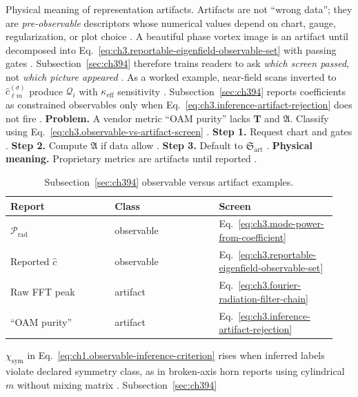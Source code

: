 Physical meaning of representation artifacts. Artifacts are not ``wrong data''; they are \emph{pre-observable} descriptors whose numerical values depend on chart, gauge, regularization, or
plot choice \cite{hansen1988}. A beautiful phase vortex image is an artifact until decomposed into
Eq.~\eqref{eq:ch3.reportable-eigenfield-observable-set} with passing gates \cite{belinfante1940}. Subsection~\ref{sec:ch394}
therefore trains readers to ask \emph{which screen passed}, not \emph{which picture appeared} \cite{harrington2001}.
As a worked example, near-field scans inverted to \(\widehat{c}_{\ell m}^{(\sigma)}\) produce \(\mathcal{Q}_i\) with \(\kappa_{\mathrm{eff}}\) sensitivity
\cite{devaney2004}. Subsection~\ref{sec:ch394} reports coefficients as constrained observables only when
Eq.~\eqref{eq:ch3.inference-artifact-rejection} does not fire \cite{harrington2001}.
\textbf{Problem.} A vendor metric ``OAM purity'' lacks \(\mathbf{T}\) and \(\mathfrak{A}\). Classify using
Eq.~\eqref{eq:ch3.observable-vs-artifact-screen} \cite{harrington2001}.
\textbf{Step 1.} Request chart and gates \cite{hansen1988}.
\textbf{Step 2.} Compute \(\mathfrak{A}\) if data allow \cite{harrington2001}.
\textbf{Step 3.} Default to \(\mathfrak{S}_{\mathrm{art}}\) \cite{belinfante1940}.
\textbf{Physical meaning.} Proprietary metrics are artifacts until reported \cite{stratton1941}.
\begin{table}[t]
\centering
\caption{Subsection~\ref{sec:ch394} observable versus artifact examples.}
\label{tab:ch3.394-examples}
\small
\begin{tabular}{@{}p{0.30\linewidth}p{0.30\linewidth}p{0.34\linewidth}@{}}
\toprule
Report & Class & Screen \\
\midrule
\(\mathcal{P}_{\mathrm{rad}}\) & observable & Eq.~\eqref{eq:ch3.mode-power-from-coefficient} \\
Reported \(\widehat{c}\) & observable & Eq.~\eqref{eq:ch3.reportable-eigenfield-observable-set} \\
Raw FFT peak & artifact & Eq.~\eqref{eq:ch3.fourier-radiation-filter-chain} \\
``OAM purity'' & artifact & Eq.~\eqref{eq:ch3.inference-artifact-rejection} \\
\bottomrule
\end{tabular}
\end{table}
\(\chi_{\mathrm{sym}}\) in Eq.~\eqref{eq:ch1.observable-inference-criterion} rises when inferred labels violate declared symmetry class, as in
broken-axis horn reports using cylindrical \(m\) without mixing matrix \cite{harrington2001}. Subsection~\ref{sec:ch394}
